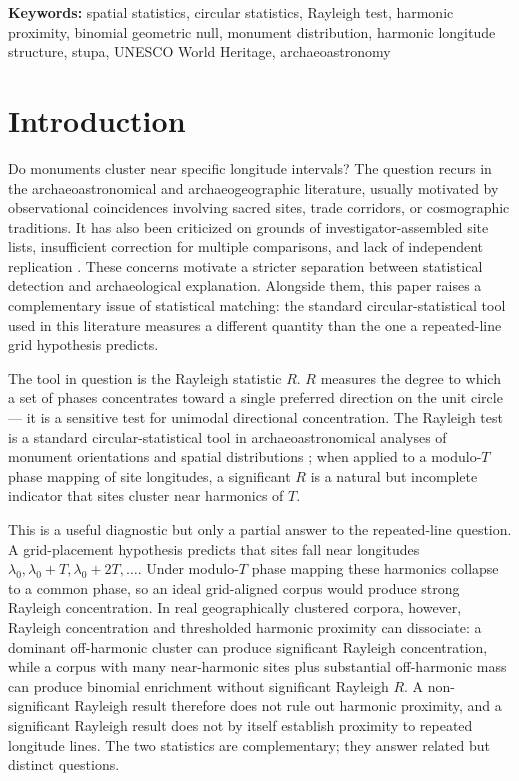 \documentclass[12pt,a4paper]{article}
\begin{document}
\bigskip
\noindent\textbf{Keywords:}
spatial statistics, circular statistics, Rayleigh test, harmonic
proximity, binomial geometric null, monument distribution, harmonic
longitude structure, stupa, UNESCO World Heritage, archaeoastronomy

\bigskip

\section{Introduction}
\label{sec:introduction}

Do monuments cluster near specific longitude intervals? The question
recurs in the archaeoastronomical and archaeogeographic literature,
usually motivated by observational coincidences involving sacred sites,
trade corridors, or cosmographic traditions. It has also been
criticized on grounds of investigator-assembled site lists,
insufficient correction for multiple comparisons, and lack of
independent replication
\citep{williamson1983leylines,freeman1976,kendall1974}. These
concerns motivate a stricter separation between statistical detection
and archaeological explanation. Alongside them, this paper raises a
complementary issue of statistical matching: the standard
circular-statistical tool used in this literature measures a
different quantity than the one a repeated-line grid hypothesis
predicts.

The tool in question is the Rayleigh statistic $R$. $R$ measures the
degree to which a set of phases concentrates toward a single preferred
direction on the unit circle --- it is a sensitive test for unimodal
directional concentration. The Rayleigh test is a standard circular-statistical tool in
archaeoastronomical analyses of monument orientations and spatial
distributions \citep{silva2020statistical,magli2013,magli2016}; when applied to a
modulo-$T$ phase mapping of site longitudes, a significant $R$ is a
natural but incomplete indicator that sites cluster near harmonics of
$T$.

This is a useful diagnostic but only a partial answer to the
repeated-line question. A grid-placement hypothesis predicts that
sites fall near longitudes $\lambda_0, \lambda_0 + T, \lambda_0 + 2T,
\ldots$. Under modulo-$T$ phase mapping these harmonics collapse to a
common phase, so an ideal grid-aligned corpus would produce strong
Rayleigh concentration. In real geographically clustered corpora,
however, Rayleigh concentration and thresholded harmonic proximity can
dissociate: a dominant off-harmonic cluster can produce significant
Rayleigh concentration, while a corpus with many near-harmonic sites
plus substantial off-harmonic mass can produce binomial enrichment
without significant Rayleigh $R$. A non-significant Rayleigh result
therefore does not rule out harmonic proximity, and a significant
Rayleigh result does not by itself establish proximity to repeated
longitude lines. The two statistics are complementary; they answer
related but distinct questions.
\end{document}
